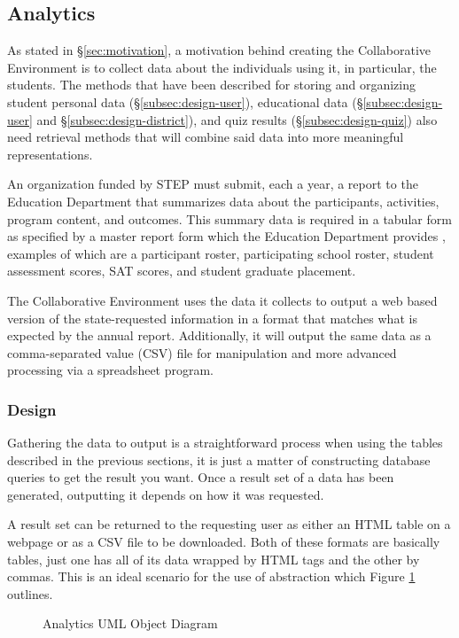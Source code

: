 \subsection{Analytics}
\label{subsec:design-analytics}
As stated in \S \ref{sec:motivation}, a motivation behind creating the Collaborative Environment is to collect data about the individuals using it, in particular, the students. The methods that have been described for storing and organizing student personal data (\S \ref{subsec:design-user}), educational data (\S \ref{subsec:design-user} and \S \ref{subsec:design-district}), and quiz results (\S \ref{subsec:design-quiz}) also need retrieval methods that will combine said data into more meaningful representations.

An organization funded by STEP must submit, each a year, a report to the Education Department that summarizes data about the participants, activities, program content, and outcomes. This summary data is required in a tabular form as specified by a master report form which the Education Department provides \cite{reportryan-doc}, examples of which are a participant roster, participating school roster, student assessment scores, SAT scores, and student graduate placement.

The Collaborative Environment uses the data it collects to output a web based version of the state-requested information in a format that matches what is expected by the annual report. Additionally, it will output the same data as a comma-separated value (CSV) file for manipulation and more advanced processing via a spreadsheet program.

\subsubsection{Design}
Gathering the data to output is a straightforward process when using the tables described in the previous sections, it is just a matter of constructing database queries to get the result you want. Once a result set of a data has been generated, outputting it depends on how it was requested.

A result set can be returned to the requesting user as either an HTML table on a webpage or as a CSV file to be downloaded. Both of these formats are basically tables, just one has all of its data wrapped by HTML tags and the other by commas. This is an ideal scenario for the use of abstraction which Figure \ref{fig:uml-analytics} outlines.

\begin{figure}[h!]
	\centering
	\caption{Analytics UML Object Diagram}
	\label{fig:uml-analytics}
\end{figure}

